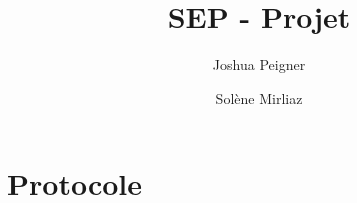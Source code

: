 \documentclass{article}
\title{SEP - Projet}
\author{Joshua Peigner \and Solène Mirliaz}
\begin{document}
\maketitle
\section{Protocole}
\end{document}
